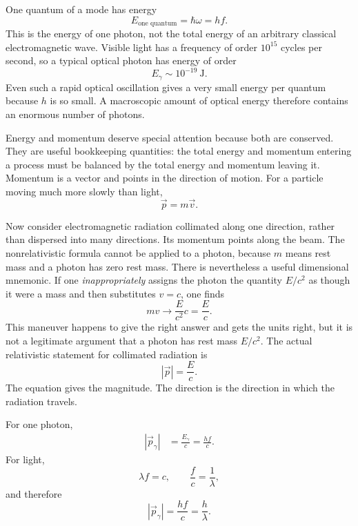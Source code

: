 One quantum of a mode has energy
\begin{equation}
E_{\text{one quantum}}=\hbar\omega=hf.
\end{equation}
This is the energy of one photon, not the total energy of an arbitrary classical electromagnetic wave. Visible light has a frequency of order \(10^{15}\) cycles per second, so a typical optical photon has energy of order
\begin{equation}
E_\gamma\sim 10^{-19}\ \mathrm{J}.
\end{equation}
Even such a rapid optical oscillation gives a very small energy per quantum because \(h\) is so small. A macroscopic amount of optical energy therefore contains an enormous number of photons.

Energy and momentum deserve special attention because both are conserved. They are useful bookkeeping quantities: the total energy and momentum entering a process must be balanced by the total energy and momentum leaving it. Momentum is a vector and points in the direction of motion. For a particle moving much more slowly than light,
\begin{equation}
\vec p=m\vec v.
\end{equation}

Now consider electromagnetic radiation collimated along one direction, rather than dispersed into many directions. Its momentum points along the beam. The nonrelativistic formula cannot be applied to a photon, because \(m\) means rest mass and a photon has zero rest mass. There is nevertheless a useful dimensional mnemonic. If one \emph{inappropriately} assigns the photon the quantity \(E/c^2\) as though it were a mass and then substitutes \(v=c\), one finds
\begin{equation}
mv\longrightarrow \frac{E}{c^2}c=\frac{E}{c}.
\end{equation}
This maneuver happens to give the right answer and gets the units right, but it is not a legitimate argument that a photon has rest mass \(E/c^2\). The actual relativistic statement for collimated radiation is
\begin{equation}
|\vec p|=\frac{E}{c}.
\end{equation}
The equation gives the magnitude. The direction is the direction in which the radiation travels.

For one photon,
\begin{align}
|\vec p_\gamma|
&=\frac{E_\gamma}{c}
=\frac{hf}{c}.
\end{align}
For light,
\begin{equation}
\lambda f=c,
\qquad
\frac{f}{c}=\frac{1}{\lambda},
\end{equation}
and therefore
\begin{equation}
|\vec p_\gamma|=\frac{hf}{c}=\frac{h}{\lambda}.
\end{equation}

